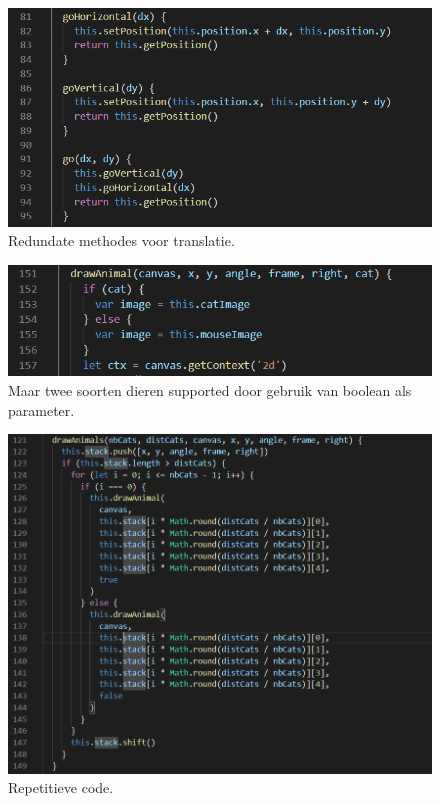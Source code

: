 \documentclass[a4paper,11pt]{article}
\begin{document}
    \begin{figure}
        \centering
        \includegraphics{img/go.png}
        \caption{Redundate methodes voor translatie.}
        \label{go}
    \end{figure}

    \begin{figure}
        \centering
        \includegraphics{img/animals.png}
        \caption{Maar twee soorten dieren supported door gebruik van boolean als parameter.}
        \label{boolAnimal}
    \end{figure}

    \begin{figure}
        \centering
        \includegraphics{img/repetitive.png}
        \caption{Repetitieve code.}
        \label{repetitive}
    \end{figure}
\end{document}
